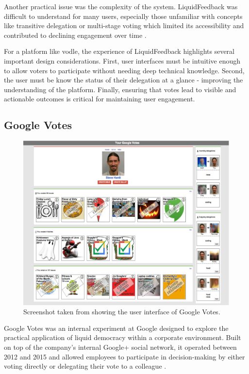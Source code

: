 Another practical issue was the complexity of the system. LiquidFeedback was difficult to understand for many users, especially those unfamiliar with concepts like transitive delegation or multi-stage voting which limited its accessibility and contributed to declining engagement over time \citep{kling2015votingbehaviourpoweronline}.

For a platform like vodle, the experience of LiquidFeedback highlights several important design considerations. First, user interfaces must be intuitive enough to allow voters to participate without needing deep technical knowledge. Second, the user must be know the status of their delegation at a glance - improving the understanding of the platform. Finally, ensuring that votes lead to visible and actionable outcomes is critical for maintaining user engagement.

\subsection{Google Votes}
\begin{figure}[H]
    \centering
    \includegraphics[width=0.8\linewidth]{../common/google_votes.png}
    \caption{Screenshot taken from \cite{hardt_google_2015} showing the user interface of Google Votes.}
\end{figure}

Google Votes was an internal experiment at Google designed to explore the practical application of liquid democracy within a corporate environment. Built on top of the company's internal Google+ social network, it operated between 2012 and 2015 and allowed employees to participate in decision-making by either voting directly or delegating their vote to a colleague \citep{hardt_google_2015}.

